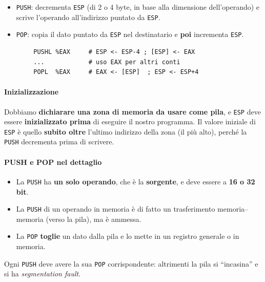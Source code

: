 \documentclass[11pt,a4paper]{article}
\begin{document}
\begin{itemize}[leftmargin=*]
  \item \texttt{PUSH}: decrementa \texttt{ESP} (di 2 o 4 byte, in base alla dimensione dell'operando) e scrive l'operando all'indirizzo puntato da \texttt{ESP}.
  \item \texttt{POP}: copia il dato puntato da \texttt{ESP} nel destinatario e \textbf{poi} incrementa \texttt{ESP}.
\end{itemize}

\begin{lstlisting}
        PUSHL %EAX     # ESP <- ESP-4 ; [ESP] <- EAX
        ...            # uso EAX per altri conti
        POPL  %EAX     # EAX <- [ESP]  ; ESP <- ESP+4
\end{lstlisting}

\paragraph*{Inizializzazione}

Dobbiamo \textbf{dichiarare una zona di memoria da usare come pila}, e \texttt{ESP} deve essere \textbf{inizializzato prima} di eseguire il nostro programma. Il valore iniziale di \texttt{ESP} è quello \textbf{subito oltre} l'ultimo indirizzo della zona (il più alto), perché la \texttt{PUSH} decrementa prima di scrivere.

\paragraph*{PUSH e POP nel dettaglio}

\begin{itemize}[leftmargin=*]
  \item La \texttt{PUSH} ha \textbf{un solo operando}, che è la \textbf{sorgente}, e deve essere a \textbf{16 o 32 bit}.
  \item La \texttt{PUSH} di un operando in memoria è di fatto un trasferimento memoria--memoria (verso la pila), ma è ammessa.
  \item La \texttt{POP} \textbf{toglie} un dato dalla pila e lo mette in un registro generale o in memoria.
\end{itemize}

\begin{nota}[Attenzione]
Ogni \texttt{PUSH} deve avere la sua \texttt{POP} corrispondente: altrimenti la pila si ``incasina'' e si ha \emph{segmentation fault}.
\end{nota}
\end{document}
